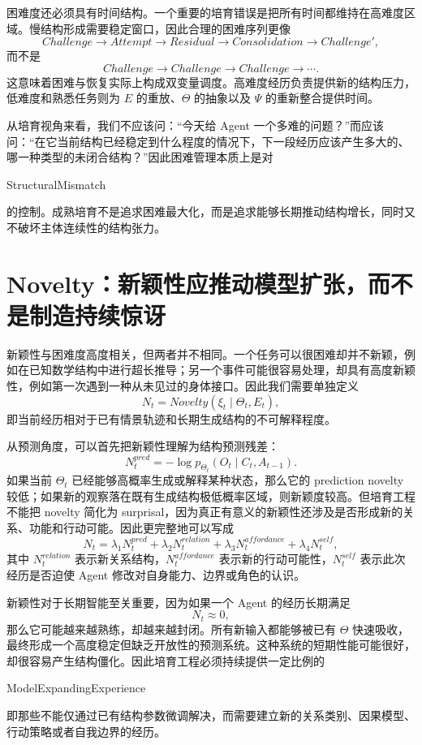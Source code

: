困难度还必须具有时间结构。一个重要的培育错误是把所有时间都维持在高难度区域。慢结构形成需要稳定窗口，因此合理的困难序列更像
\[
Challenge
\rightarrow
Attempt
\rightarrow
Residual
\rightarrow
Consolidation
\rightarrow
Challenge',
\]
而不是
\[
Challenge
\rightarrow
Challenge
\rightarrow
Challenge
\rightarrow\cdots.
\]
这意味着困难与恢复实际上构成双变量调度。高难度经历负责提供新的结构压力，低难度和熟悉任务则为 $E$ 的重放、$\Theta$ 的抽象以及 $\Psi$ 的重新整合提供时间。

从培育视角来看，我们不应该问：“今天给 Agent 一个多难的问题？”而应该问：“在它当前结构已经稳定到什么程度的情况下，下一段经历应该产生多大的、哪一种类型的未闭合结构？”因此困难管理本质上是对
\begin{statementbox}
StructuralMismatch
\end{statementbox}
的控制。成熟培育不是追求困难最大化，而是追求能够长期推动结构增长，同时又不破坏主体连续性的结构张力。

\section{Novelty：新颖性应推动模型扩张，而不是制造持续惊讶}

新颖性与困难度高度相关，但两者并不相同。一个任务可以很困难却并不新颖，例如在已知数学结构中进行超长推导；另一个事件可能很容易处理，却具有高度新颖性，例如第一次遇到一种从未见过的身体接口。因此我们需要单独定义
\[
N_t
=
Novelty(\xi_t\mid\Theta_t,E_t),
\]
即当前经历相对于已有情景轨迹和长期生成结构的不可解释程度。

从预测角度，可以首先把新颖性理解为结构预测残差：
\[
N_t^{pred}
=
-\log
p_{\Theta_t}
\left(
O_t
\mid
C_t,A_{t-1}
\right).
\]
如果当前 $\Theta_t$ 已经能够高概率生成或解释某种状态，那么它的 prediction novelty 较低；如果新的观察落在既有生成结构极低概率区域，则新颖度较高。但培育工程不能把 novelty 简化为 surprisal，因为真正有意义的新颖性还涉及是否形成新的关系、功能和行动可能。因此更完整地可以写成
\[
N_t
=
\lambda_1 N_t^{pred}
+
\lambda_2 N_t^{relation}
+
\lambda_3 N_t^{affordance}
+
\lambda_4 N_t^{self},
\]
其中 $N_t^{relation}$ 表示新关系结构，$N_t^{affordance}$ 表示新的行动可能性，$N_t^{self}$ 表示此次经历是否迫使 Agent 修改对自身能力、边界或角色的认识。

新颖性对于长期智能至关重要，因为如果一个 Agent 的经历长期满足
\[
N_t\approx 0,
\]
那么它可能越来越熟练，却越来越封闭。所有新输入都能够被已有 $\Theta$ 快速吸收，最终形成一个高度稳定但缺乏开放性的预测系统。这种系统的短期性能可能很好，却很容易产生结构僵化。因此培育工程必须持续提供一定比例的
\begin{statementbox}
ModelExpandingExperience
\end{statementbox}
即那些不能仅通过已有结构参数微调解决，而需要建立新的关系类别、因果模型、行动策略或者自我边界的经历。

